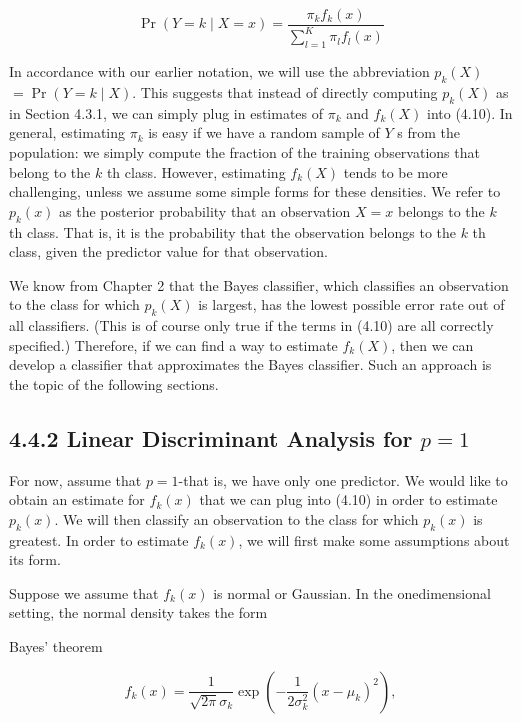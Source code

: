 \documentclass[10pt]{article}
\begin{document}
\begin{equation*}
\operatorname{Pr}(Y=k \mid X=x)=\frac{\pi_{k} f_{k}(x)}{\sum_{l=1}^{K} \pi_{l} f_{l}(x)} \tag{4.10}
\end{equation*}


In accordance with our earlier notation, we will use the abbreviation $p_{k}(X)$ $=\operatorname{Pr}(Y=k \mid X)$. This suggests that instead of directly computing $p_{k}(X)$ as in Section 4.3.1, we can simply plug in estimates of $\pi_{k}$ and $f_{k}(X)$ into (4.10). In general, estimating $\pi_{k}$ is easy if we have a random sample of $Y$ s from the population: we simply compute the fraction of the training observations that belong to the $k$ th class. However, estimating $f_{k}(X)$ tends to be more challenging, unless we assume some simple forms for these densities. We refer to $p_{k}(x)$ as the posterior probability that an observation $X=x$ belongs to the $k$ th class. That is, it is the probability that the observation belongs to the $k$ th class, given the predictor value for that observation.

We know from Chapter 2 that the Bayes classifier, which classifies an observation to the class for which $p_{k}(X)$ is largest, has the lowest possible error rate out of all classifiers. (This is of course only true if the terms in (4.10) are all correctly specified.) Therefore, if we can find a way to estimate $f_{k}(X)$, then we can develop a classifier that approximates the Bayes classifier. Such an approach is the topic of the following sections.

\subsection*{4.4.2 Linear Discriminant Analysis for $p=1$}
For now, assume that $p=1$-that is, we have only one predictor. We would like to obtain an estimate for $f_{k}(x)$ that we can plug into (4.10) in order to estimate $p_{k}(x)$. We will then classify an observation to the class for which $p_{k}(x)$ is greatest. In order to estimate $f_{k}(x)$, we will first make some assumptions about its form.

Suppose we assume that $f_{k}(x)$ is normal or Gaussian. In the onedimensional setting, the normal density takes the form

Bayes' theorem


\begin{equation*}
f_{k}(x)=\frac{1}{\sqrt{2 \pi} \sigma_{k}} \exp \left(-\frac{1}{2 \sigma_{k}^{2}}\left(x-\mu_{k}\right)^{2}\right), \tag{4.11}
\end{equation*}
\end{document}
